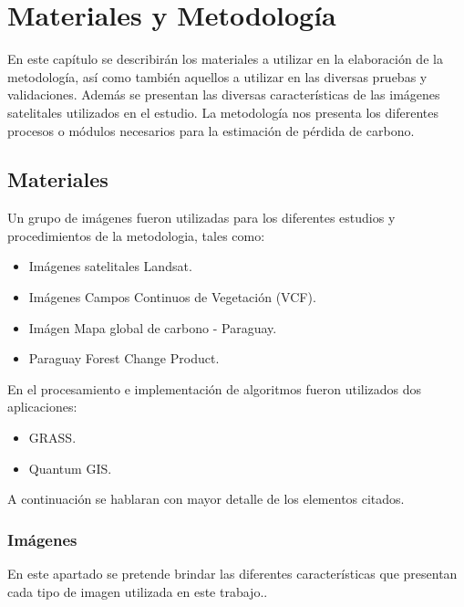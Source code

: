 \newpage{\ } 
\thispagestyle{empty} 

\chapter{Materiales y Metodolog\'ia}
En este cap\'itulo se describir\'an los materiales a utilizar en la elaboraci\'on de la metodolog\'ia, as\'i como tambi\'en aquellos a utilizar en las diversas pruebas y validaciones. Adem\'as se presentan las diversas caracter\'isticas de las im\'agenes satelitales utilizados en el estudio. La metodolog\'ia nos presenta los diferentes procesos o m\'odulos necesarios para la estimaci\'on de p\'erdida de carbono.
\section{Materiales}
Un grupo de im\'agenes fueron utilizadas para los diferentes estudios y procedimientos de la metodologia, tales como:
\begin{itemize}
	\item Im\'agenes satelitales Landsat.
	\item Im\'agenes Campos Continuos de Vegetaci\'on (VCF).
	\item Im\'agen Mapa global de carbono - Paraguay.
	\item Paraguay Forest Change Product.
\end{itemize}
En el procesamiento e implementaci\'on de algoritmos fueron utilizados dos aplicaciones:
\begin{itemize}
	\item GRASS.
	\item Quantum GIS.
\end{itemize}
A continuaci\'on se hablaran con mayor detalle de los elementos citados.
\subsection{Im\'agenes}
En este apartado se pretende brindar las diferentes caracter\'isticas que presentan cada tipo de imagen utilizada en este trabajo..
